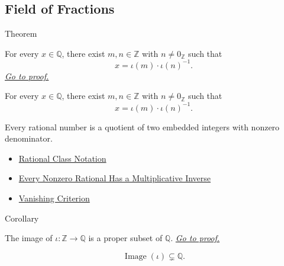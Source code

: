 \subsection*{Field of Fractions}

\begin{theorembox}{Theorem}
\begin{theorem}
\label{thm:q-is-field-of-fractions-of-z}
For every $x\in\mathbb{Q}$, there exist $m,n\in\mathbb{Z}$ with
$n\ne0_{\mathbb{Z}}$ such that
\[
x=\iota(m)\cdot \iota(n)^{-1}.
\]
\hyperref[prf:q-is-field-of-fractions-of-z]{\textit{Go to proof.}}
\end{theorem}
\end{theorembox}

\begin{remark*}
For every $x\in\mathbb{Q}$, there exist $m,n\in\mathbb{Z}$ with
$n\ne0_{\mathbb{Z}}$ such that
\[
x=\iota(m)\cdot\iota(n)^{-1}.
\]
\end{remark*}

\begin{remark*}[Interpretation]
Every rational number is a quotient of two embedded integers with nonzero
denominator.
\end{remark*}

\begin{dependencies}
\begin{itemize}
  \item \hyperref[def:rational-class-notation]{Rational Class Notation}
  \item \hyperref[thm:every-nonzero-rational-has-multiplicative-inverse]{Every Nonzero Rational Has a Multiplicative Inverse}
  \item \hyperref[lem:vanishing-criterion-q]{Vanishing Criterion}
\end{itemize}
\end{dependencies}

\begin{corollarybox}{Corollary}
\begin{corollary}
\label{cor:embedding-z-into-q-not-surjective}
The image of $\iota:\mathbb{Z}\to\mathbb{Q}$ is a proper subset of
\(\mathbb{Q}\).
\hyperref[prf:embedding-z-into-q-not-surjective]{\textit{Go to proof.}}
\end{corollary}
\end{corollarybox}

\begin{remark*}
\[
\operatorname{Image}(\iota)\subsetneq\mathbb{Q}.
\]
\end{remark*}

